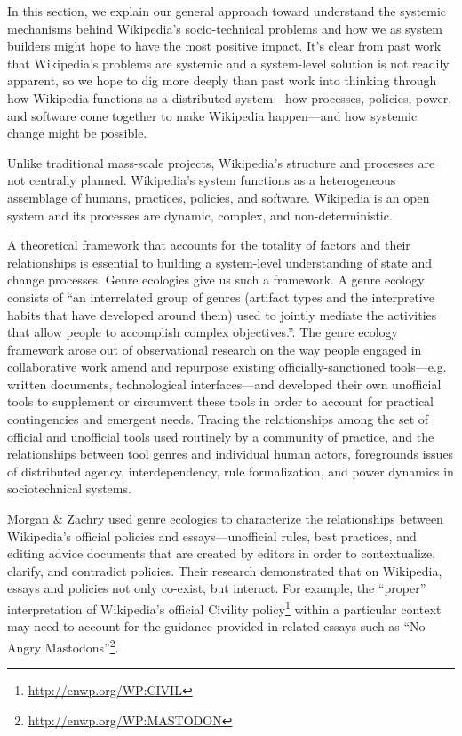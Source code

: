 In this section, we explain our general approach toward understand the systemic mechanisms behind Wikipedia's socio-technical problems and how we as system builders might hope to have the most positive impact.  It's clear from past work that Wikipedia's problems are systemic and a system-level solution is not readily apparent, so we hope to dig more deeply than past work into thinking through how Wikipedia functions as a distributed system---how processes, policies, power, and software come together to make Wikipedia happen---and how systemic change might be possible.

  Unlike traditional mass-scale projects, Wikipedia's structure and processes are not centrally planned.  Wikipedia's system functions as a heterogeneous assemblage of humans, practices, policies, and software.  Wikipedia is an open system and its processes are dynamic, complex, and non-deterministic.

A theoretical framework that accounts for the totality of factors and their relationships is essential to building a system-level understanding of state and change processes.  Genre ecologies give us such a framework. A genre ecology consists of ``an interrelated group of genres (artifact types and the interpretive habits that have developed around them) used to jointly mediate the activities that allow people to accomplish complex objectives.''\cite{spinuzzi2000genre}. The genre ecology framework arose out of observational research on the way people engaged in collaborative work amend and repurpose existing officially-sanctioned tools---e.g. written documents, technological interfaces---and developed their own unofficial tools to supplement or circumvent these tools in order to account for practical contingencies and emergent needs. Tracing the relationships among the set of official and unofficial tools used routinely by a community of practice, and the relationships between tool genres and individual human actors, foregrounds issues of distributed agency, interdependency, rule formalization, and power dynamics in sociotechnical systems\cite{spinuzzi2003tracing}.

Morgan \& Zachry used genre ecologies to characterize the relationships between Wikipedia's official policies and essays---unofficial rules, best practices, and editing advice documents that are created by editors in order to contextualize, clarify, and contradict policies\cite{morgan2010negotiating}. Their research demonstrated that on Wikipedia, essays and policies not only co-exist, but interact. For example, the ``proper'' interpretation of Wikipedia's official Civility policy\footnote{\url{http://enwp.org/WP:CIVIL}} within a particular context may need to account for the guidance provided in related essays such as ``No Angry Mastodons''\footnote{\url{http://enwp.org/WP:MASTODON}}.

